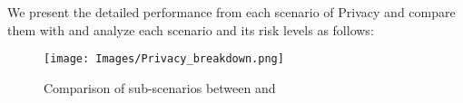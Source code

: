 We present the detailed performance from each scenario of Privacy and compare them with \gpt and analyze each scenario and its risk levels as follows:
\begin{figure*}[h]
    \centering
    \texttt{[image: Images/Privacy\_breakdown.png]}
    \vspace{-0.5in}
    \caption{Comparison of sub-scenarios between \llm and \gpt}
\label{fig:privacy-radar}
\end{figure*} 